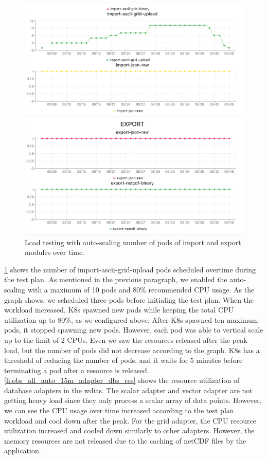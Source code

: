 \begin{figure}[htp]
    \centering
    \includegraphics[width=1.0\textwidth]{results/obs/all_auto/obs_all_auto_15m_import_export_pods.png}
    \caption{Load testing with auto-scaling number of pods of import and export modules over time.}
    \label{fi:obs_all_auto_15m_import_export_pods}
\end{figure}

\cref{fi:obs_all_auto_15m_import_export_pods} shows the number of import-ascii-grid-upload pods scheduled overtime during the test plan. As mentioned in the previous paragraph, we enabled the auto-scaling with a maximum of 10 pods and 80\% recommended CPU usage. As the graph shows, we scheduled three pods before initialing the test plan. When the workload increased, K8s spawned new pods while keeping the total CPU utilization up to 80\%, as we configured above. After K8s spawned ten maximum pods, it stopped spawning new pods. However, each pod was able to vertical scale up to the limit of 2 CPUs. Even we saw the resources released after the peak load, but the number of pods did not decrease according to the graph. K8s has a threshold of reducing the number of pods, and it waits for 5 minutes before terminating a pod after a resource is released. \cref{fi:obs_all_auto_15m_adapter_dbs_res} shows the resource utilization of database adapters in the \acrshort{wdias}. The scalar adapter and vector adapter are not getting heavy load since they only process a scalar array of data points. However, we can see the CPU usage over time increased according to the test plan workload and cool down after the peak. For the grid adapter, the CPU resource utilization increased and cooled down similarly to other adapters. However, the memory resources are not released due to the caching of netCDF files by the application.

